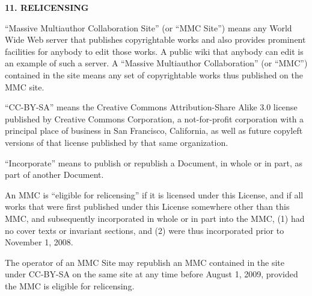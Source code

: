 \begin{center}
  {\Large\bf 11. RELICENSING\par} 
\end{center}


``Massive Multiauthor Collaboration Site'' (or ``MMC Site'') means any World
Wide Web server that publishes copyrightable works and also provides prominent
facilities for anybody to edit those works. A public wiki that anybody can edit
is an example of such a server. A ``Massive Multiauthor Collaboration'' (or
``MMC'') contained in the site means any set of copyrightable works thus
published on the MMC site.

``CC-BY-SA'' means the Creative Commons Attribution-Share Alike 3.0 license
published by Creative Commons Corporation, a not-for-profit corporation with a
principal place of business in San Francisco, California, as well as future
copyleft versions of that license published by that same organization.

``Incorporate'' means to publish or republish a Document, in whole or in part,
as part of another Document.

An MMC is ``eligible for relicensing'' if it is licensed under this License, and
if all works that were first published under this License somewhere other than
this MMC, and subsequently incorporated in whole or in part into the MMC, (1)
had no cover texts or invariant sections, and (2) were thus incorporated prior
to November 1, 2008.

The operator of an MMC Site may republish an MMC contained in the site under
CC-BY-SA on the same site at any time before August 1, 2009, provided the MMC is
eligible for relicensing.
